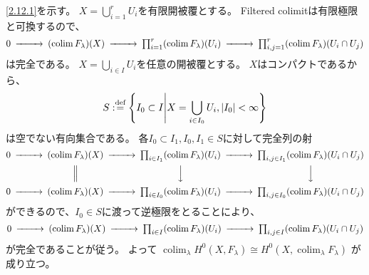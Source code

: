 \documentclass[uplatex,dvipdfmx]{jsarticle}
\makeatletter
\theoremstyle{definition}
\renewenvironment{proof}[1][\proofname]{
  \pushQED{\qed}%
  \normalfont \topsep6\p@\@plus6\p@\relax
  \trivlist
  \item[\hskip\labelsep
    #1\@addpunct{\textbf{.}}]\ignorespaces
}{%
  \popQED\endtrivlist\@endpefalse
}
\providecommand{\proofname}{証明}
\DeclareMathOperator{\colim}{\mathrm{colim}}
\def\dfn{:\overset{\mbox{{\scriptsize def}}}{=}}
\makeatother
\begin{document}
\begin{proof}
  \ref{2.12.1}を示す。
  \(X=\bigcup_{i=1}^r U_i\)を有限開被覆とする。
  Filtered colimitは有限極限と可換するので、
  \[
  \begin{CD}
    0 @>>> (\colim F_{\lambda})(X) @>>> \prod_{i=1}^r (\colim F_{\lambda})(U_i)
    @>>> \prod_{i,j=1}^r (\colim F_{\lambda})(U_i\cap U_j)
  \end{CD}
  \]
  は完全である。
  \(X=\bigcup_{i\in I}U_i\)を任意の開被覆とする。
  \(X\)はコンパクトであるから、
  \[S\dfn \left\{I_0\subset I\middle| X=\bigcup_{i\in I_0}U_i, |I_0|<\infty\right\}\]
  は空でない有向集合である。
  各\(I_0\subset I_1, I_0,I_1\in S\)に対して完全列の射
  \[
  \begin{CD}
    0 @>>> (\colim F_{\lambda})(X) @>>> \prod_{i\in I_1} (\colim F_{\lambda})(U_i)
    @>>> \prod_{i,j\in I_1} (\colim F_{\lambda})(U_i\cap U_j) \\
    @. @| @VVV @VVV \\
    0 @>>> (\colim F_{\lambda})(X) @>>> \prod_{i\in I_0} (\colim F_{\lambda})(U_i)
    @>>> \prod_{i,j\in I_0} (\colim F_{\lambda})(U_i\cap U_j)
  \end{CD}
  \]
  ができるので、\(I_0\in S\)に渡って逆極限をとることにより、
  \[
  \begin{CD}
    0 @>>> (\colim F_{\lambda})(X) @>>> \prod_{i\in I} (\colim F_{\lambda})(U_i)
    @>>> \prod_{i,j\in I} (\colim F_{\lambda})(U_i\cap U_j)
  \end{CD}
  \]
  が完全であることが従う。
  よって
  \(\colim_{\lambda}H^0(X,F_{\lambda}) \cong H^0(X,\colim_{\lambda}F_{\lambda})\)
  が成り立つ。


\end{proof}
\end{document}

